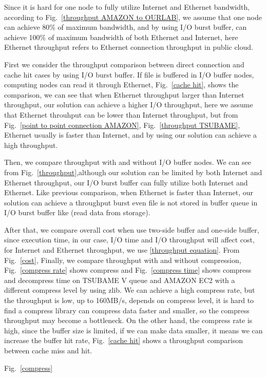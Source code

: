 Since it is hard for one node to fully utilize Internet and Ethernet bandwidth, according to Fig.~\ref{throughput AMAZON to OURLAB}, we assume that one node can achieve 80\% of maximum bandwidth, and by using I/O burst buffer, can achieve 100\% of maximum bandwidth of both Ethernet and Internet, here Ethernet throughput refers to Ethernet connection throughput in public cloud.

First we consider the throughput comparison between direct connection and cache hit cases by using I/O burst buffer.
If file is buffered in I/O buffer nodes, computing nodes can read it through Ethernet, Fig.~\ref{cache hit}, shows the comparison, we can see that when Ethernet throughput larger than Internet throughput, our solution can achieve a higher I/O throughput, here we assume that Ethernet throuhput can be lower than Internet throughput, but from Fig.~\ref{point to point connection AMAZON}, Fig.~\ref{throughput TSUBAME}, Ethernet usually is faster than Internet, and by using our solution can achieve a high throughput.

Then, we compare throughput with and without I/O buffer nodes.
We can see from Fig.~\ref{throughput},although our solution can be limited by both Internet and Ethernet throughput, our I/O burst buffer can fully utilize both Internet and Ethernet. Like previous comparison, when Ethernet is faster than Internet, our solution can achieve a throughput burst even file is not stored in buffer queue in I/O burst buffer like (read data from storage).

After that, we compare overall cost when use two-side buffer and one-side buffer, since execution time, in our case, I/O time and I/O throughput will affect cost, for Internet and Ethernet throughput, we use \ref{throughput equation}.
From Fig.~\ref{cost}, 
Finally, we compare throughput with and without compression, Fig.~\ref{compress rate} shows compress and Fig.~\ref{compress time} shows compress and decompress time on TSUBAME V queue and AMAZON EC2 with a different compress level by using zlib\cite{zlib}.
We can achieve a high compress rate, but the throughput is low, up to 160MB/s, depends on compress level, it is hard to find a compress library can compress data faster and smaller, so the compress throughput may become a bottleneck.
On the other hand, the compress rate is high, since the buffer size is limited, if we can make data smaller, it means we can increase the buffer hit rate, Fig.~\ref{cache hit} shows a throughput comparison between cache miss and hit.

Fig.~\ref{compress}

